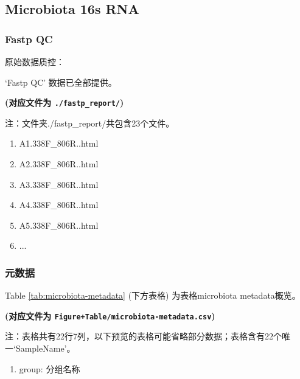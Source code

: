 \documentclass[
]{article}
\providecommand{\tightlist}{%
  \setlength{\itemsep}{0pt}\setlength{\parskip}{0pt}}
\begin{document}
\hypertarget{microbiota-16s-rna}{%
\subsection{Microbiota 16s RNA}\label{microbiota-16s-rna}}

\hypertarget{fastp-qc}{%
\subsubsection{Fastp QC}\label{fastp-qc}}

原始数据质控：

`Fastp QC' 数据已全部提供。

\textbf{(对应文件为 \texttt{./fastp\_report/})}

\begin{center}\begin{tcolorbox}[colback=gray!10, colframe=gray!50, width=0.9\linewidth, arc=1mm, boxrule=0.5pt]注：文件夹./fastp\_report/共包含23个文件。

\begin{enumerate}\tightlist
\item A1.338F\_806R..html
\item A2.338F\_806R..html
\item A3.338F\_806R..html
\item A4.338F\_806R..html
\item A5.338F\_806R..html
\item ...
\end{enumerate}\end{tcolorbox}
\end{center}

\hypertarget{ux5143ux6570ux636e}{%
\subsubsection{元数据}\label{ux5143ux6570ux636e}}

Table \ref{tab:microbiota-metadata} (下方表格) 为表格microbiota metadata概览。

\textbf{(对应文件为 \texttt{Figure+Table/microbiota-metadata.csv})}

\begin{center}\begin{tcolorbox}[colback=gray!10, colframe=gray!50, width=0.9\linewidth, arc=1mm, boxrule=0.5pt]注：表格共有22行7列，以下预览的表格可能省略部分数据；表格含有22个唯一`SampleName'。
\end{tcolorbox}
\end{center}
\begin{center}\begin{tcolorbox}[colback=gray!10, colframe=gray!50, width=0.9\linewidth, arc=1mm, boxrule=0.5pt]\begin{enumerate}\tightlist
\item group:  分组名称
\end{enumerate}\end{tcolorbox}
\end{center}
\end{document}

